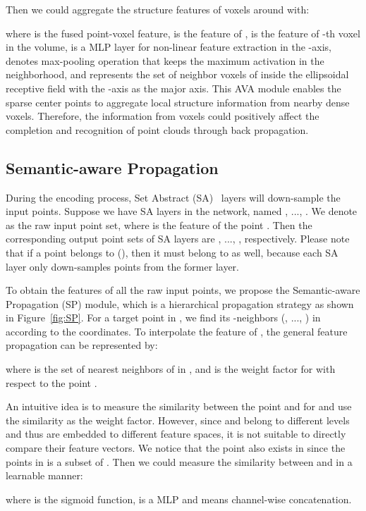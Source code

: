 Then we could aggregate the structure features of voxels around  with: 

where  is the fused point-voxel feature, 
 is the feature of , 
 is the feature of -th voxel in the volume,
 is a MLP layer for non-linear feature extraction in the -axis,
 denotes max-pooling operation that keeps the maximum activation in the neighborhood,
and  represents the set of neighbor voxels of  inside the ellipsoidal receptive field with the -axis as the major axis.
This AVA module enables the sparse center points to aggregate local structure information from nearby dense voxels.
Therefore, the information from voxels could positively affect the completion and recognition of point clouds through back propagation.

\subsection{Semantic-aware Propagation}
\label{sec:SP}
During the encoding process, Set Abstract (SA)~\cite{qi2017pointnet++} layers will down-sample the input points. 
Suppose we have  SA layers in the network, named , ..., . 
We denote  as the raw input point set, where  is the feature of the point . 
Then the corresponding output point sets of  SA layers are , ..., , respectively. 
Please note that if a point belongs to  (), then it must belong to  as well, because each SA layer only down-samples points from the former layer. 

To obtain the features of all the raw input points, 
we propose the Semantic-aware Propagation (SP) module, which is a hierarchical propagation strategy as shown in Figure~\ref{fig:SP}.
For a target point  in , we find its -neighbors (, ..., ) in  according to the  coordinates. 
To interpolate the feature of , the general feature propagation can be represented by:

where  is the set of  nearest neighbors of  in , and  is the weight factor for  with respect to the point .

An intuitive idea is to measure the similarity between the point  and  for  and use the similarity as the weight factor. 
However, since  and  belong to different levels and thus are embedded to different feature spaces, 
it is not suitable to directly compare their feature vectors. 
We notice that the point  also exists in  since the points in  is a subset of . 
Then we could measure the similarity between  and  in a learnable manner:

where  is the sigmoid function,  is a MLP and  means channel-wise concatenation. 

